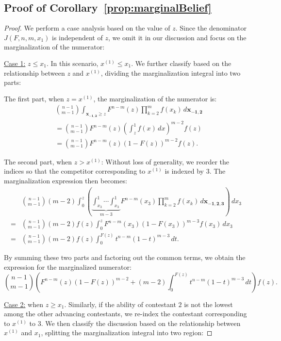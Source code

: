 \subsection*{Proof of Corollary~\ref{prop:marginalBelief}}
\begin{proof}
We perform a case analysis based on the value of \( z \). Since the denominator \( J(F,n,m,x_1) \) is independent of \( z \), we omit it in our discussion and focus on the marginalization of the numerator:

\underline{Case 1:} \( z \leq x_1 \). In this scenario, \( x^{(1)} \leq x_1 \). We further classify based on the relationship between \( z \) and \( x^{(1)} \), dividing the marginalization integral into two parts:

The first part, when \( z = x^{(1)} \), the marginalization of the numerator is:
\[
\begin{aligned}
    & \binom{n-1}{m-1} \int_{\mathbf{x_{-1,2}} \geq z} F^{n-m}(z) \prod_{k=2}^m f(x_k) \, d\mathbf{x_{-1,2}} \\ 
    & = \binom{n-1}{m-1} F^{n-m}(z) \left ( \int_{z}^{1} f(x) \, dx \right )^{m-2} f(z) \\
    & = \binom{n-1}{m-1} F^{n-m}(z) (1-F(z))^{m-2} f(z).
\end{aligned}
\]

The second part, when \( z > x^{(1)} \): Without loss of generality, we reorder the indices so that the competitor corresponding to \( x^{(1)} \) is indexed by $3$. The marginalization expression then becomes:
\[
\begin{aligned}
    & \binom{n-1}{m-1}(m-2) \int_0^z \left ( \underbrace{\int_{x_3}^{1} \cdots \int_{x_3}^{1}}_{m-3} F^{n-m}(x_3) \prod_{k=2}^m f(x_k) \, d\mathbf{x_{-1,2,3}} \right ) \, dx_3 \\
    = & \binom{n-1}{m-1}(m-2) f(z) \int_0^{z} F^{n-m}(x_3) (1-F(x_3))^{m-3} f(x_3) \, dx_3 \\
    = & \binom{n-1}{m-1}(m-2) f(z) \int_0^{F(z)} t^{n-m} (1-t)^{m-3} \, dt.
\end{aligned}
\]

By summing these two parts and factoring out the common terms, we obtain the expression for the marginalized numerator:
\[
\binom{n-1}{m-1} \left ( F^{n-m}(z)(1-F(z))^{m-2} + (m-2) \int_0^{F(z)} t^{n-m} (1-t)^{m-3} \, dt \right ) f(z).
\]

\underline{Case 2:} when \( z \geq x_1 \). Similarly, if the ability of contestant $2$ is not the lowest among the other advancing contestants, we re-index the contestant corresponding to \( x^{(1)} \) to 3. We then classify the discussion based on the relationship between \( x^{(1)} \) and \( x_1 \), splitting the marginalization integral into two region:


\end{proof}
